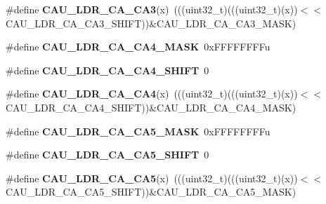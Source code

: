 \begin{DoxyCompactItemize}
\item 
\#define {\bfseries C\+A\+U\+\_\+\+L\+D\+R\+\_\+\+C\+A\+\_\+\+C\+A3}(x)~(((uint32\+\_\+t)(((uint32\+\_\+t)(x))$<$$<$C\+A\+U\+\_\+\+L\+D\+R\+\_\+\+C\+A\+\_\+\+C\+A3\+\_\+\+S\+H\+I\+FT))\&C\+A\+U\+\_\+\+L\+D\+R\+\_\+\+C\+A\+\_\+\+C\+A3\+\_\+\+M\+A\+SK)\hypertarget{group__CAU__Register__Masks_ga01e9876211bc7569a7fed8b22019a8aa}{}\label{group__CAU__Register__Masks_ga01e9876211bc7569a7fed8b22019a8aa}

\item 
\#define {\bfseries C\+A\+U\+\_\+\+L\+D\+R\+\_\+\+C\+A\+\_\+\+C\+A4\+\_\+\+M\+A\+SK}~0x\+F\+F\+F\+F\+F\+F\+F\+Fu\hypertarget{group__CAU__Register__Masks_gae6080270193ec350954328f66ffc6526}{}\label{group__CAU__Register__Masks_gae6080270193ec350954328f66ffc6526}

\item 
\#define {\bfseries C\+A\+U\+\_\+\+L\+D\+R\+\_\+\+C\+A\+\_\+\+C\+A4\+\_\+\+S\+H\+I\+FT}~0\hypertarget{group__CAU__Register__Masks_ga401e274bfc5075ec0e72d885071c3415}{}\label{group__CAU__Register__Masks_ga401e274bfc5075ec0e72d885071c3415}

\item 
\#define {\bfseries C\+A\+U\+\_\+\+L\+D\+R\+\_\+\+C\+A\+\_\+\+C\+A4}(x)~(((uint32\+\_\+t)(((uint32\+\_\+t)(x))$<$$<$C\+A\+U\+\_\+\+L\+D\+R\+\_\+\+C\+A\+\_\+\+C\+A4\+\_\+\+S\+H\+I\+FT))\&C\+A\+U\+\_\+\+L\+D\+R\+\_\+\+C\+A\+\_\+\+C\+A4\+\_\+\+M\+A\+SK)\hypertarget{group__CAU__Register__Masks_gad677866f6f1b4e9731a6852124fc13c8}{}\label{group__CAU__Register__Masks_gad677866f6f1b4e9731a6852124fc13c8}

\item 
\#define {\bfseries C\+A\+U\+\_\+\+L\+D\+R\+\_\+\+C\+A\+\_\+\+C\+A5\+\_\+\+M\+A\+SK}~0x\+F\+F\+F\+F\+F\+F\+F\+Fu\hypertarget{group__CAU__Register__Masks_gafb0c705253f6e6bde84a7d415b022364}{}\label{group__CAU__Register__Masks_gafb0c705253f6e6bde84a7d415b022364}

\item 
\#define {\bfseries C\+A\+U\+\_\+\+L\+D\+R\+\_\+\+C\+A\+\_\+\+C\+A5\+\_\+\+S\+H\+I\+FT}~0\hypertarget{group__CAU__Register__Masks_gaac2d34d8c6a22632b669e944970f7318}{}\label{group__CAU__Register__Masks_gaac2d34d8c6a22632b669e944970f7318}

\item 
\#define {\bfseries C\+A\+U\+\_\+\+L\+D\+R\+\_\+\+C\+A\+\_\+\+C\+A5}(x)~(((uint32\+\_\+t)(((uint32\+\_\+t)(x))$<$$<$C\+A\+U\+\_\+\+L\+D\+R\+\_\+\+C\+A\+\_\+\+C\+A5\+\_\+\+S\+H\+I\+FT))\&C\+A\+U\+\_\+\+L\+D\+R\+\_\+\+C\+A\+\_\+\+C\+A5\+\_\+\+M\+A\+SK)\hypertarget{group__CAU__Register__Masks_ga38b6e6fffada195c136892a02019c7f4}{}\label{group__CAU__Register__Masks_ga38b6e6fffada195c136892a02019c7f4}


\end{DoxyCompactItemize}
